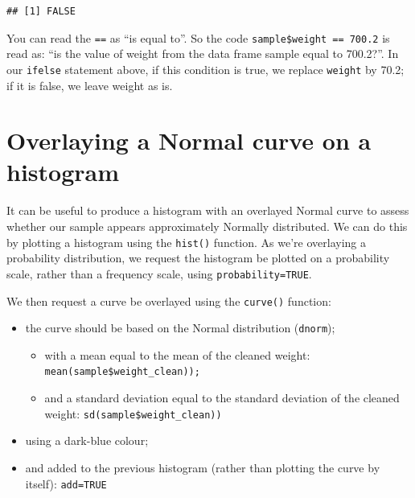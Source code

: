 \documentclass[
]{memoir}
\begin{document}
\begin{verbatim}
## [1] FALSE
\end{verbatim}

You can read the \texttt{==} as ``is equal to''. So the code \texttt{sample\$weight\ ==\ 700.2} is read as: ``is the value of weight from the data frame sample equal to 700.2?''. In our \texttt{ifelse} statement above, if this condition is true, we replace \texttt{weight} by 70.2; if it is false, we leave weight as is.

\hypertarget{overlaying-a-normal-curve-on-a-histogram}{%
\section{Overlaying a Normal curve on a histogram}\label{overlaying-a-normal-curve-on-a-histogram}}

It can be useful to produce a histogram with an overlayed Normal curve to assess whether our sample appears approximately Normally distributed. We can do this by plotting a histogram using the \texttt{hist()} function. As we're overlaying a probability distribution, we request the histogram be plotted on a probability scale, rather than a frequency scale, using \texttt{probability=TRUE}.

We then request a curve be overlayed using the \texttt{curve()} function:

\begin{itemize}
\item
  the curve should be based on the Normal distribution (\texttt{dnorm});

  \begin{itemize}
  \item
    with a mean equal to the mean of the cleaned weight: \texttt{mean(sample\$weight\_clean));}
  \item
    and a standard deviation equal to the standard deviation of the cleaned weight: \texttt{sd(sample\$weight\_clean))}
  \end{itemize}
\item
  using a dark-blue colour;
\item
  and added to the previous histogram (rather than plotting the curve by itself): \texttt{add=TRUE}
\end{itemize}
\end{document}
